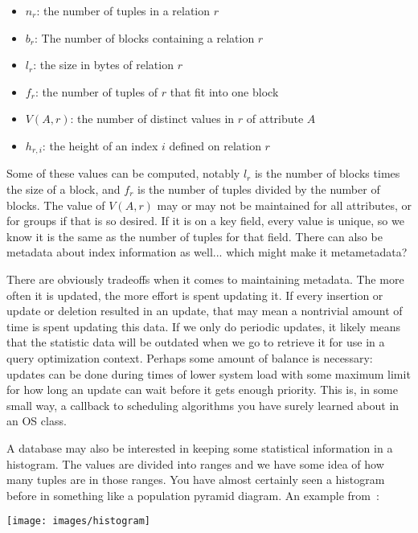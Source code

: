 \begin{itemize}
	\item $n_{r}$: the number of tuples in a relation $r$ 
	\item $b_{r}$: The number of blocks containing a relation $r$ 
	\item $l_{r}$: the size in bytes of relation $r$
	\item $f_{r}$: the number of tuples of $r$ that fit into one block
	\item $V(A, r)$: the number of distinct values in $r$ of attribute $A$
	\item $h_{r, i}$: the height of an index $i$ defined on relation $r$
\end{itemize}

Some of these values can be computed, notably $l_{r}$ is the number of blocks times the size of a block, and $f_{r}$ is the number of tuples divided by the number of blocks. The value of $V(A, r)$ may or may not be maintained for all attributes, or for groups if that is so desired. If it is on a key field, every value is unique, so we know it is the same as the number of tuples for that field. There can also be metadata about index information as well... which might make it metametadata? 

There are obviously tradeoffs when it comes to maintaining metadata. The more often it is updated, the more effort is spent updating it. If every insertion or update or deletion resulted in an update, that may mean a nontrivial amount of time is spent updating this data. If we only do periodic updates, it likely means that the statistic data will be outdated when we go to retrieve it for use in a query optimization context. Perhaps some amount of balance is necessary: updates can be done during times of lower system load with some maximum limit for how long an update can wait before it gets enough priority. This is, in some small way, a callback to scheduling algorithms you have surely learned about in an OS class. 

A database may also be interested in keeping some statistical information in a histogram. The values are divided into ranges and we have some idea of how many tuples are in those ranges. You have almost certainly seen a histogram before in something like a population pyramid diagram. An example from~\cite{dsc}:

\begin{center}
\texttt{[image: images/histogram]}
\end{center}

